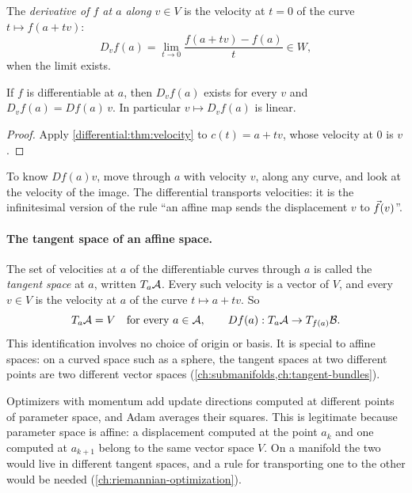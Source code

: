 \begin{notechapter}
\begin{definition}\label{differential:def:directional}
The \emph{derivative of $f$ at $a$ along} $v\in V$ is the velocity at
$t = 0$ of the curve $t\mapsto f(a + tv)$:
\[
  D_vf(a) = \lim_{t\to0}\frac{f(a + tv) - f(a)}t \in W ,
\]
when the limit exists.
\end{definition}

\begin{corollary}\label{differential:cor:directional}
If $f$ is differentiable at $a$, then $D_vf(a)$ exists for every $v$ and
$D_vf(a) = Df(a)\,v$. In particular $v\mapsto D_vf(a)$ is linear.
\end{corollary}

\begin{proof}
Apply \cref{differential:thm:velocity} to $c(t) = a + tv$, whose velocity
at $0$ is $v$.
\end{proof}

\begin{intuition}
To know $Df(a)v$, move through $a$ with velocity $v$, along any curve, and
look at the velocity of the image. The differential transports
velocities: it is the infinitesimal version of the rule ``an affine map
sends the displacement $v$ to $\vec{f}(v)$''.
\end{intuition}

\paragraph{The tangent space of an affine space.} The set of velocities at
$a$ of the differentiable curves through $a$ is called the \emph{tangent
space} at $a$, written $T_a\mathcal{A}$. Every such velocity is a vector of $V$,
and every $v\in V$ is the velocity at $a$ of the curve $t\mapsto a + tv$.
So
\[
  T_a\mathcal{A} = V \quad\text{for every } a\in\mathcal{A} ,
  \qquad Df(a):T_a\mathcal{A}\to T_{f(a)}\mathcal{B} .
\]
This identification involves no choice of origin or basis. It is special
to affine spaces: on a curved space such as a sphere, the tangent spaces
at two different points are two different vector spaces
(\cref{ch:submanifolds,ch:tangent-bundles}).

\begin{mlthread}
Optimizers with momentum add update directions computed at different
points of parameter space, and Adam averages their squares. This is
legitimate because parameter space is affine: a displacement computed at
the point $a_k$ and one computed at $a_{k+1}$ belong to the same vector
space $V$. On a manifold the two would live in different tangent spaces,
and a rule for transporting one to the other would be needed
(\cref{ch:riemannian-optimization}).
\end{mlthread}


\end{notechapter}
